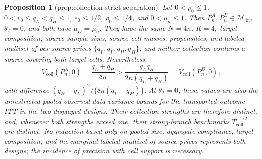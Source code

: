 \documentclass{article}
\newtheorem{proposition}{Proposition}
\begin{document}
\begin{proposition}[prop:collection-strict-separation]\label{prop:collection-strict-separation}
Let \(0<p_0\le1\), \(0<v_0\le q_L<q_H\le1\), \(e_0\le1/2\), \(\rho_0\le1/4\), and \(0<\mu_n\le1\). Then \(P_n^A,P_n^B\in\mathcal M_{4n}\), \(\theta_T=0\), and both have \(\mu_D=\mu_n\). They have the same \(N=4n\), \(K=4\), target composition, source sample sizes, source cell masses, propensities, and labeled multiset of per-source prices \(\{q_L,q_L,q_H,q_H\}\), and neither collection contains a source covering both target cells. Nevertheless,
\[
V_{\mathrm{coll}}(P_n^A,0)=\frac{q_L+q_H}{8n}>
\frac{q_Lq_H}{2n(q_L+q_H)}=V_{\mathrm{coll}}(P_n^B,0),
\]
with difference \((q_H-q_L)^2/\{8n(q_L+q_H)\}\). At \(\theta_T=0\), these values are also the unrestricted pooled observed-data variance bounds for the transported outcome ITT in the two displayed designs. Their collection strengths are therefore distinct, and, whenever both strengths exceed one, their strong-branch benchmarks \(T_{\mathrm{coll}}^{-1/2}\) are distinct. No reduction based only on pooled size, aggregate compliance, target composition, and the marginal labeled multiset of source prices represents both designs; the incidence of precision with cell support is necessary.
\end{proposition}
\end{document}
